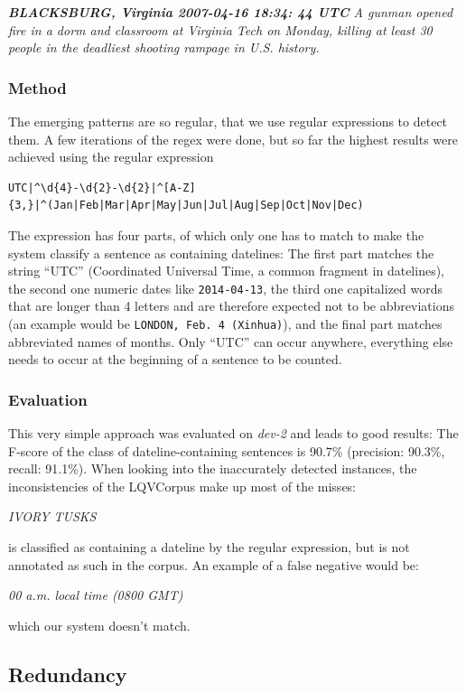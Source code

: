 \documentclass[a4paper,10pt]{scrartcl}
\theoremstyle{style}
\begin{document}
\textit{\textbf{BLACKSBURG, Virginia 2007-04-16 18:34: 44 UTC} A gunman opened fire in a dorm and classroom at Virginia Tech on Monday, killing at least 30 people in the deadliest shooting rampage in U.S. history.}



\subsubsection{Method}
The emerging patterns are so regular, that we use regular expressions to detect them. A few iterations of the regex were done, but so far the highest results were achieved using the regular expression

\begin{lstlisting}
UTC|^\d{4}-\d{2}-\d{2}|^[A-Z]{3,}|^(Jan|Feb|Mar|Apr|May|Jun|Jul|Aug|Sep|Oct|Nov|Dec)
\end{lstlisting}

The expression has four parts, of which only one has to match to make the system classify a sentence as containing datelines: The first part matches the string ``UTC'' (Coordinated Universal Time, a common fragment in datelines), the second one numeric dates like \texttt{2014-04-13}, the third one capitalized words that are longer than 4 letters and are therefore expected not to be abbreviations (an example would be \texttt{LONDON, Feb. 4 (Xinhua)}), and the final part matches abbreviated names of months. Only ``UTC'' can occur anywhere, everything else needs to occur at the beginning of a sentence to be counted.

\subsubsection{Evaluation}
This very simple approach was evaluated on \textit{dev-2} and leads to good results: The F-score of the class of dateline-containing sentences is 90.7\% (precision: 90.3\%, recall: 91.1\%). When looking into the inaccurately detected instances, the inconsistencies of the LQVCorpus make up most of the misses:

\textit{IVORY TUSKS}

is classified as containing a dateline by the regular expression, but is not annotated as such in the corpus. An example of a false negative would be:

\textit{00 a.m. local time (0800 GMT)}

which our system doesn't match.

\subsection{Redundancy}
\label{redundancy}
\end{document}
